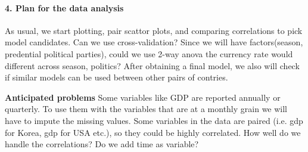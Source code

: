 \documentclass[12pt]{article}
\begin{document}
\paragraph{4. Plan for the data analysis}
As usual, we start plotting, pair scattor plots, and comparing correlations to pick model candidates. Can we use cross-validation? Since we will have factors(season, predential political parties), could we use 2-way anova the currency rate would different across season, politics?
After obtaining a final model, we also will check if similar models can be
used between other pairs of contries.

\textbf{Anticipated problems}
Some variables like GDP are reported annually or quarterly. To use them with the
variables that are at a monthly grain we will have to impute the missing
values. Some variables in the data are paired (i.e. gdp for Korea, gdp for USA
etc.), so they could be highly correlated. How well do we handle the
correlations? Do we add time as variable? 
\end{document}
